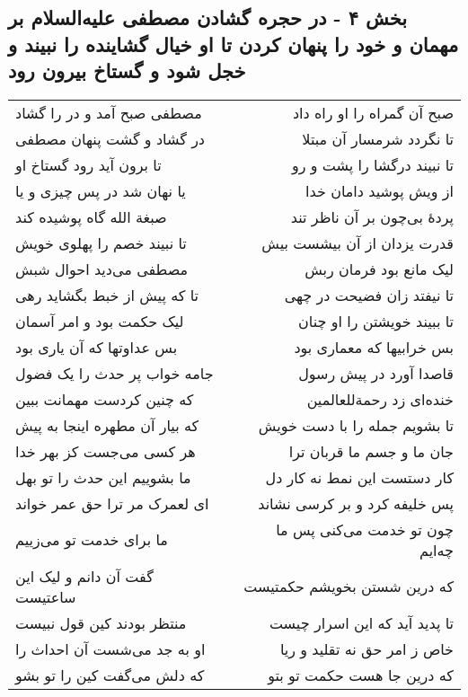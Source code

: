 \begin{center}
\section*{بخش ۴ - در حجره گشادن مصطفی علیه‌السلام بر مهمان و خود را پنهان  کردن تا او خیال گشاینده را نبیند و خجل شود و گستاخ  بیرون رود}
\label{sec:sh004}
\begin{longtable}{l p{0.5cm} r}
مصطفی صبح آمد و در را گشاد
&&
صبح آن گمراه را او راه داد
\\
در گشاد و گشت پنهان مصطفی
&&
تا نگردد شرمسار آن مبتلا
\\
تا برون آید رود گستاخ او
&&
تا نبیند درگشا را پشت و رو
\\
یا نهان شد در پس چیزی و یا
&&
از ویش پوشید دامان خدا
\\
صبغة الله گاه پوشیده کند
&&
پردهٔ بی‌چون بر آن ناظر تند
\\
تا نبیند خصم را پهلوی خویش
&&
قدرت یزدان از آن بیشست بیش
\\
مصطفی می‌دید احوال شبش
&&
لیک مانع بود فرمان ربش
\\
تا که پیش از خبط بگشاید رهی
&&
تا نیفتد زان فضیحت در چهی
\\
لیک حکمت بود و امر آسمان
&&
تا ببیند خویشتن را او چنان
\\
بس عداوتها که آن یاری بود
&&
بس خرابیها که معماری بود
\\
جامه خواب پر حدث را یک فضول
&&
قاصدا آورد در پیش رسول
\\
که چنین کردست مهمانت ببین
&&
خنده‌ای زد رحمةللعالمین
\\
که بیار آن مطهره اینجا به پیش
&&
تا بشویم جمله را با دست خویش
\\
هر کسی می‌جست کز بهر خدا
&&
جان ما و جسم ما قربان ترا
\\
ما بشوییم این حدث را تو بهل
&&
کار دستست این نمط نه کار دل
\\
ای لعمرک مر ترا حق عمر خواند
&&
پس خلیفه کرد و بر کرسی نشاند
\\
ما برای خدمت تو می‌زییم
&&
چون تو خدمت می‌کنی پس ما چه‌ایم
\\
گفت آن دانم و لیک این ساعتیست
&&
که درین شستن بخویشم حکمتیست
\\
منتظر بودند کین قول نبیست
&&
تا پدید آید که این اسرار چیست
\\
او به جد می‌شست آن احداث را
&&
خاص ز امر حق نه تقلید و ریا
\\
که دلش می‌گفت کین را تو بشو
&&
که درین جا هست حکمت تو بتو
\\
\end{longtable}
\end{center}
